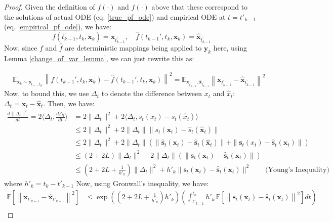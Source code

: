 \documentclass[11pt]{article}
\def\rvx{{\mathbf{x}}}
\def\rvy{{\mathbf{y}}}
\def\vs{{\bm{s}}}
\newcommand{\E}{\mathbb{E}}
\begin{document}
\begin{proof}
Given the definition of $f(\cdot)$ and $\hat{f}(\cdot)$ above that these correspond to the solutions of actual ODE (eq. \ref{true_pf_ode}) and empirical ODE at $t=t'_{k-1}$ (eq. \ref{empirical_pf_ode}), we have:
\begin{equation*}
    f(t_{k-1}^\prime, t_k, \rvx_k) = \rvx_{t_{k-1}^\prime},  \quad \hat{f}(t_{k-1}',t_k,{\rvx}_k) = \hat{\rvx}_{t^\prime_{k-1}}
\end{equation*}
Now, since $f$ and $\hat{f}$ are deterministic mappings being applied to $\rvy_k$ here, using Lemma \ref{change_of_var_lemma}, we can just rewrite this as:

\begin{equation*}
    \begin{aligned}
        &\E_{\rvx_k \sim {p}_{t_1,.., t_{K}}}\left\|f(t_{k-1}',t_k,{\rvx}_k)-\hat{f}(t_{k-1}',t_k,{\rvx}_k)\right\|^2 = \E_{\rvx_{t^\prime_{k-1}}, \hat{\rvx}_{t^\prime_{k-1}}}\left\|\rvx_{t^\prime_{k-1}} - \hat{\rvx}_{t^\prime_{k-1}} \right\|^2 
    \end{aligned}
\end{equation*}
Now, to bound this, we use $\Delta_t$ to denote the difference between $x_t$ and $\hat{x}_t$: $\Delta_t=\rvx_t-\hat{\rvx}_t$. Then, we have:
\begin{equation*}
\begin{aligned}
    \frac{d \|\Delta_t\|^2}{dt} = 2\langle\Delta_t, \frac{d \Delta_t}{dt}\rangle &= 2\|\Delta_t\|^2 + 2\langle\Delta_t,s_t(x_t)-\hat{s}_t(\hat{x}_t)\rangle \\
    &\leq 2\|\Delta_t\|^2 + 2\|\Delta_t\|\|s_t(\rvx_t)-\hat{s}_t(\hat{\rvx}_t)\| \\
    &\leq 2\|\Delta_t\|^2 + 2\|\Delta_t\|\left(\|\hat{\vs}_t(\rvx_t)-\hat{\vs}_t(\hat{\rvx}_t)\| +\|\vs_t({x}_t)-\hat{\vs}_t({\rvx}_t)\|\right) \\
    &\leq (2+2L)\|\Delta_t\|^2 + 2\|\Delta_t\|\left(\|\vs_t({\rvx}_t)-\hat{\vs}_t({\rvx}_t)\|\right) \\
    &\leq \left(2+2L+\frac{1}{h'_k}\right) \|\Delta_t\|^2 + h'_k\|\vs_t({\rvx}_t)-\hat{\vs}_t({\rvx}_t)\|^2 \qquad \text{(Young's Inequality)}
    \end{aligned}
\end{equation*}
where $h'_k = t_k-t'_{k-1}$ Now, using Gronwall's inequality, we have:
\begin{align*}
\mathbb{E}\left[\left\| \rvx_{t'_{k-1}} - \hat{\rvx}_{t'_{k-1}} \right\|^2\right] &\leq \exp\left(\left(2 + 2L +  \frac{1}{h'_k} \right)h'_k\right)\left(  \int_{t'_{k-1}}^{t_k}  h'_{k}\, \mathbb{E}\left[\left\|   \vs_t({\rvx}_t) - \hat{\vs}_{t}({\rvx}_{t}) \right\|^2\right] dt \right) \\

\end{align*}
\end{proof}
\end{document}

